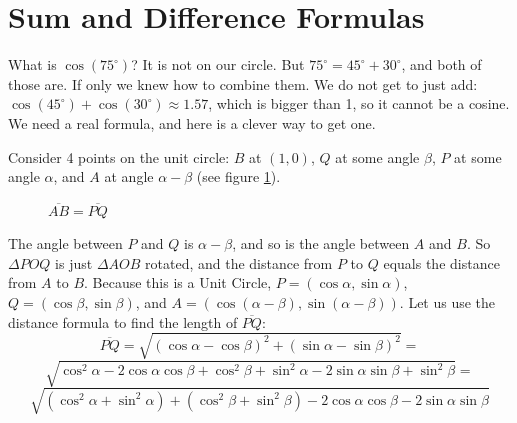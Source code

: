 \section{Sum and Difference Formulas}
What is $\cos(75^\circ)$? It is not on
our circle. But $75^\circ = 45^\circ + 30^\circ$, and both of those are.
If only we knew how to combine them. We do not get to just add: $\cos(45^\circ) + \cos(30^\circ) \approx 1.57$, which is bigger than 1, so it cannot be a cosine. We need a real formula, and here is a clever way to get one.

Consider 4 points on the unit circle: $B$ at $(1, 0)$, $Q$ at some angle 
$\beta$, $P$ at some angle $\alpha$, and $A$ at angle $\alpha - \beta$ (see 
figure \ref{fig:difference}). 

\begin{figure}[H]
    \centering
    \caption{$\overline{AB} = \overline{PQ}$}
    \label{fig:difference}
\end{figure}

The angle between $P$ and $Q$ is $\alpha - \beta$, and so is the angle
between $A$ and $B$. So $\Delta POQ$ is just $\Delta AOB$ rotated, and the
distance from $P$ to $Q$ equals the distance from $A$ to $B$. Because this is a Unit 
Circle, $P = (\cos{\alpha}, \sin{\alpha})$, $Q = (\cos{\beta}, \sin{\beta})$, 
and $A = (\cos(\alpha - \beta), \sin(\alpha - \beta))$. Let us use the distance
formula to find the length of $\overline{PQ}$:
$$\overline{PQ} = \sqrt{\left(\cos{\alpha} - \cos{\beta} \right)^2 + \left( 
\sin{\alpha} - \sin{\beta} \right)^2} =$$
$$\sqrt{\cos^2{\alpha} - 2\cos{\alpha}\cos{\beta} + \cos^2{\beta} + \sin^2{
\alpha} - 2\sin{\alpha}\sin{\beta} + \sin^2{\beta}} = $$
$$\sqrt{\left( \cos^2{\alpha} + \sin^2{\alpha} \right) + \left( \cos^2{\beta} 
+ \sin^2{\beta} \right) - 2\cos{\alpha}\cos{\beta} - 2\sin{\alpha}\sin{\beta}}
$$


